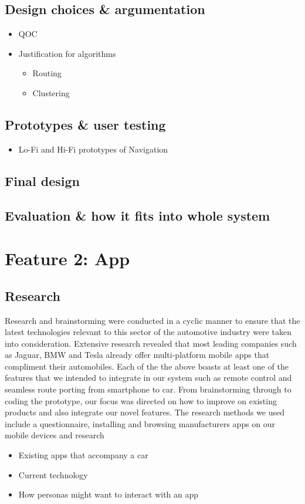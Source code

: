\documentclass{article}
\begin{document}
\subsection{Design choices \& argumentation}
  \begin{itemize}
    \item QOC
    \item Justification for algorithms
      \begin{itemize}
        \item Routing
        \item Clustering
      \end{itemize}
  \end{itemize}
\subsection{Prototypes \& user testing}
\begin{itemize}
	\item Lo-Fi and Hi-Fi prototypes of Navigation
\end{itemize}
\subsection{Final design}
\subsection{Evaluation \& how it fits into whole system}

\section{Feature 2: App}
\subsection{Research}
Research and brainstorming were conducted in a cyclic manner to ensure that the latest technologies relevant to this sector of the automotive industry were taken into consideration. Extensive research revealed that most leading companies such as Jaguar, BMW and Tesla already offer multi-platform mobile apps that compliment their automobiles. Each of the the above boasts at least one of the features that we intended to integrate in our system such as remote control and seamless route porting from smartphone to car. From brainstorming through to coding the prototype, our focus was directed on how to improve on existing products and also integrate our novel features. 
The research methods we used include a questionnaire, installing and browsing manufacturers apps on our mobile devices and research
	\begin{itemize}
		\item Existing apps that accompany a car
        \item Current technology
		\item How personas might want to interact with an app
	\end{itemize}
\end{document}
